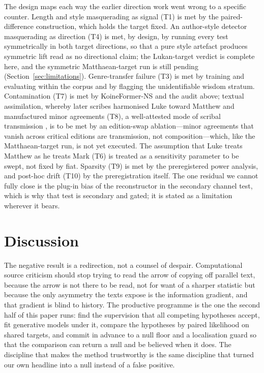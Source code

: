 \documentclass[11pt,letterpaper]{article}
\begin{document}
The design maps each way the earlier direction work went wrong to a specific counter. Length and style masquerading as signal (T1) is met by the paired-difference construction, which holds the target fixed. An author-style detector masquerading as direction (T4) is met, by design, by running every test symmetrically in both target directions, so that a pure style artefact produces symmetric lift read as no directional claim; the Lukan-target verdict is complete here, and the symmetric Matthaean-target run is still pending (Section~\ref{sec:limitations}). Genre-transfer failure (T3) is met by training and evaluating within the corpus and by flagging the unidentifiable wisdom stratum. Contamination (T7) is met by KoineFormer-NS and the audit above; textual assimilation, whereby later scribes harmonised Luke toward Matthew and manufactured minor agreements (T8), a well-attested mode of scribal transmission \citep{metzger2005}, is to be met by an edition-swap ablation---minor agreements that vanish across critical editions are transmission, not composition---which, like the Matthaean-target run, is not yet executed. The assumption that Luke treats Matthew as he treats Mark (T6) is treated as a sensitivity parameter to be swept, not fixed by fiat. Sparsity (T9) is met by the preregistered power analysis, and post-hoc drift (T10) by the preregistration itself. The one residual we cannot fully close is the plug-in bias of the reconstructor in the secondary channel test, which is why that test is secondary and gated; it is stated as a limitation wherever it bears.

\section{Discussion}
\label{sec:discussion}

The negative result is a redirection, not a counsel of despair. Computational source criticism should stop trying to read the arrow of copying off parallel text, because the arrow is not there to be read, not for want of a sharper statistic but because the only asymmetry the texts expose is the information gradient, and that gradient is blind to history. The productive programme is the one the second half of this paper runs: find the supervision that all competing hypotheses accept, fit generative models under it, compare the hypotheses by paired likelihood on shared targets, and commit in advance to a null floor and a localisation guard so that the comparison can return a null and be believed when it does. The discipline that makes the method trustworthy is the same discipline that turned our own headline into a null instead of a false positive.
\end{document}

